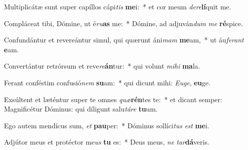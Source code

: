 \item Multiplicátæ sunt super capíllos cápi\textit{tis} \textbf{me}i:~* et cor meum \textit{de}\textit{re}\textbf{lí}quit me.
\item Compláceat tibi, Dómine, ut é\textit{ru}\textbf{as} me:~* Dómine, ad adjuván\textit{dum} \textit{me} \textbf{ré}spice.
\item Confundántur et revereántur simul, qui quærunt áni\textit{mam} \textbf{me}am,~* ut áu\textit{fe}\textit{rant} \textbf{e}am.
\item Convertántur retrórsum et reve\textit{re}\textbf{án}tur:~* qui volunt \textit{mi}\textit{hi} \textbf{ma}la.
\item Ferant conféstim confusió\textit{nem} \textbf{su}am:~* qui dicunt mihi: \textit{Eu}\textit{ge}, \textbf{eu}ge.
\item Exsúltent et læténtur super te omnes \textit{quæ}\textbf{rén}tes te:~* et dicant semper: Magnificétur Dóminus: qui díligunt salu\textit{tá}\textit{re} \textbf{tu}um.
\item Ego autem mendícus sum, \textit{et} \textbf{pau}per:~* Dóminus sollíci\textit{tus} \textit{est} \textbf{me}i.
\item Adjútor meus et protéctor me\textit{us} \textbf{tu} es:~* Deus meus, \textit{ne} \textit{tar}\textbf{dá}veris.
